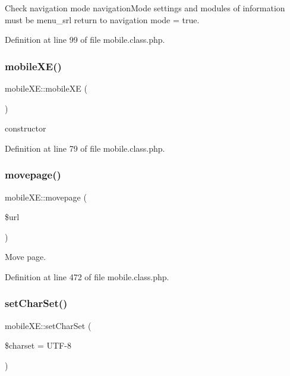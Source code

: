 Check navigation mode navigation\+Mode settings and modules of information must be menu\+\_\+srl return to navigation mode = true. 



Definition at line 99 of file mobile.\+class.\+php.

\hypertarget{classmobileXE_a5be500c41083816790ef47deed4a66df}{}\label{classmobileXE_a5be500c41083816790ef47deed4a66df} 
\subsubsection{\texorpdfstring{mobile\+X\+E()}{mobileXE()}}
{\footnotesize\ttfamily mobile\+X\+E\+::mobile\+XE (\begin{DoxyParamCaption}{ }\end{DoxyParamCaption})}



constructor 



Definition at line 79 of file mobile.\+class.\+php.

\hypertarget{classmobileXE_aed0ec3795acddd89572e740d3b31c806}{}\label{classmobileXE_aed0ec3795acddd89572e740d3b31c806} 
\subsubsection{\texorpdfstring{movepage()}{movepage()}}
{\footnotesize\ttfamily mobile\+X\+E\+::movepage (\begin{DoxyParamCaption}\item[{}]{\$url }\end{DoxyParamCaption})}



Move page. 



Definition at line 472 of file mobile.\+class.\+php.

\hypertarget{classmobileXE_abcb54cc8b685d1411acbd667e707d030}{}\label{classmobileXE_abcb54cc8b685d1411acbd667e707d030} 
\subsubsection{\texorpdfstring{set\+Char\+Set()}{setCharSet()}}
{\footnotesize\ttfamily mobile\+X\+E\+::set\+Char\+Set (\begin{DoxyParamCaption}\item[{}]{\$charset = {\ttfamily \textquotesingle{}UTF-\/8\textquotesingle{}} }\end{DoxyParamCaption})}



